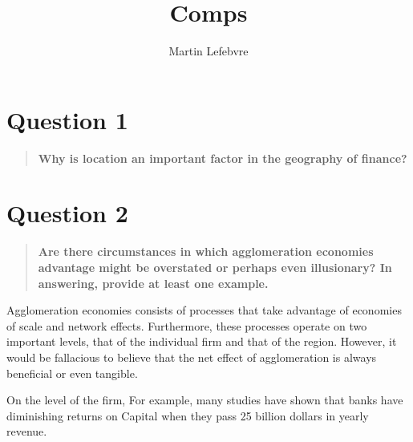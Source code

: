 \documentclass[12pt,letterpaper,notitlepage,onecolumn,final,openbib]{article}
\author{Martin Lefebvre}
\title{Comps}
\begin{document}
 
	
\section{Question 1}
\begin{quotation}
	\textbf{Why is location an important factor in the geography of finance?}
\end{quotation}



\section{Question 2}
\begin{quotation}
	\textbf{Are there circumstances in which agglomeration economies advantage might be overstated or perhaps even illusionary? In answering, provide at least one example.}
\end{quotation}

Agglomeration economies consists of processes that take advantage of economies of scale and network effects.  Furthermore, these processes operate on two important levels, that of the individual firm and that of the region.  However, it would be fallacious to believe that the net effect of agglomeration is always beneficial or even tangible.   

On the level of the firm, 
For example, many studies have shown that banks have diminishing returns on Capital when they pass 25 billion dollars in yearly revenue.  \cite{Yves2010_Myths}
%

%
%	
%			
\end{document}

